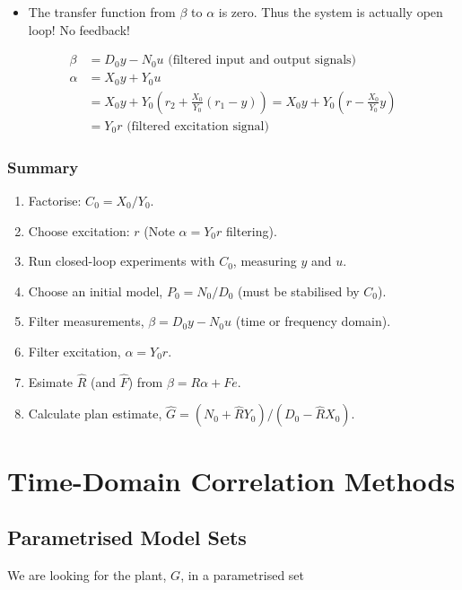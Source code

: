 \documentclass[10pt,a4paper]{scrartcl}
\begin{document}
\begin{multicols*}{2}
\begin{itemize}
\item The transfer function from $\beta$ to $\alpha$ is zero. Thus the system is actually open loop! No feedback! 
\end{itemize}


\begin{align*}
\beta&=D_0y-N_0u \text{ (filtered input and output signals)}\\
\alpha&=X_0y+Y_0u\\
&=X_0y+Y_0\left(r_2+\frac{X_0}{Y_0}(r_1-y)\right)=X_0y+Y_0\left(r-\frac{X_0}{Y_0}y\right)\\
&=Y_0r\text{ (filtered excitation signal)}
\end{align*}

\subsubsection{Summary}

\begin{enumerate}
\item Factorise: $C_0=X_0/Y_0$.
\item Choose excitation: $r$ (Note $\alpha = Y_0r$ filtering).
\item Run closed-loop experiments with $C_0$, measuring $y$ and $u$.
\item Choose an initial model, $P_0=N_0/D_0$ (must be stabilised by $C_0$).
\item Filter measurements, $\beta =D_0y-N_0u$ (time or frequency domain).
\item Filter excitation, $\alpha = Y_0r$.
\item Esimate $\hat{R}$ (and $\hat{F}$) from $\beta = R\alpha + Fe$.
\item Calculate plan estimate, $\hat{G}=(N_0+\hat{R}Y_0)/(D_0-\hat{R}X_0)$.
\end{enumerate}

\section{Time-Domain Correlation Methods}

\subsection{Parametrised Model Sets}

We are looking for the plant, $G$, in a parametrised set


\end{multicols*}
\end{document}
